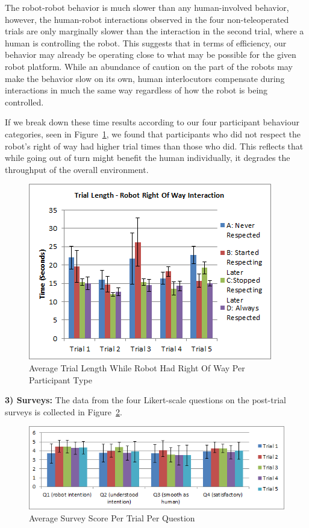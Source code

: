\documentclass[letterpaper, 10 pt, conference]{ieeeconf}  %
\begin{document}
The robot-robot behavior is much slower than any human-involved behavior, however, the human-robot interactions observed in the four non-teleoperated trials are only marginally slower than the interaction in the second trial, where a human is controlling the robot. This suggests that in terms of efficiency, our behavior may already be operating close to what may be possible for the given robot platform. While an abundance of caution on the part of the robots may make the behavior slow on its own, human interlocutors compensate during interactions in much the same way regardless of how the robot is being controlled. 

If we break down these time results according to our four participant behaviour categories, seen in Figure~\ref{fig:Respect}, we found that participants who did not respect the robot's right of way had higher trial times than those who did. This reflects that while going out of turn might benefit the human individually, it degrades the throughput of the overall environment. 
     \begin{figure}
      \centering
      \includegraphics{Robot_right.png}
      \caption{Average Trial Length While Robot Had Right Of Way Per Participant Type}
      \label{fig:Respect}
   \end{figure}

\textbf{3) Surveys:} The data from the four Likert-scale questions on the post-trial surveys is collected in Figure~\ref{fig:Questionnaire}. 
 
     \begin{figure}
      \centering
      \includegraphics[width=\textwidth]{Questionnaire.png}
      \caption{Average Survey Score Per Trial Per Question }
      \label{fig:Questionnaire}
   \end{figure}
 
\end{document}

